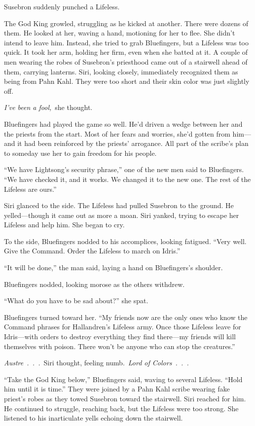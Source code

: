Susebron suddenly punched a Lifeless.

The God King growled, struggling as he kicked at another. There were dozens of them. He looked at her, waving a hand, motioning for her to flee. She didn’t intend to leave him. Instead, she tried to grab Bluefingers, but a Lifeless was too quick. It took her arm, holding her firm, even when she batted at it. A couple of men wearing the robes of Susebron’s priesthood came out of a stairwell ahead of them, carrying lanterns. Siri, looking closely, immediately recognized them as being from Pahn Kahl. They were too short and their skin color was just slightly off.

\textit{I’ve been a fool,}~she thought.

Bluefingers had played the game so well. He’d driven a wedge between her and the priests from the start. Most of her fears and worries, she’d gotten from him—and it had been reinforced by the priests’ arrogance. All part of the scribe’s plan to someday use her to gain freedom for his people.

“We have Lightsong’s security phrase,” one of the new men said to Bluefingers. “We have checked it, and it works. We changed it to the new one. The rest of the Lifeless are ours.”

Siri glanced to the side. The Lifeless had pulled Susebron to the ground. He yelled—though it came out as more a moan. Siri yanked, trying to escape her Lifeless and help him. She began to cry.

To the side, Bluefingers nodded to his accomplices, looking fatigued. “Very well. Give the Command. Order the Lifeless to march on Idris.”

“It will be done,” the man said, laying a hand on Bluefingers’s shoulder.

Bluefingers nodded, looking morose as the others withdrew.

“What do you have to be sad about?” she spat.

Bluefingers turned toward her. “My friends now are the only ones who know the Command phrases for Hallandren’s Lifeless army. Once those Lifeless leave for Idris—with orders to destroy everything they find there—my friends will kill themselves with poison. There won’t be anyone who can stop the creatures.”

\textit{Austre~.~.~.}~Siri thought, feeling numb.~\textit{Lord of Colors~.~.~.}

“Take the God King below,” Bluefingers said, waving to several Lifeless. “Hold him until it is time.” They were joined by a Pahn Kahl scribe wearing fake priest’s robes as they towed Susebron toward the stairwell. Siri reached for him. He continued to struggle, reaching back, but the Lifeless were too strong. She listened to his inarticulate yells echoing down the stairwell.

